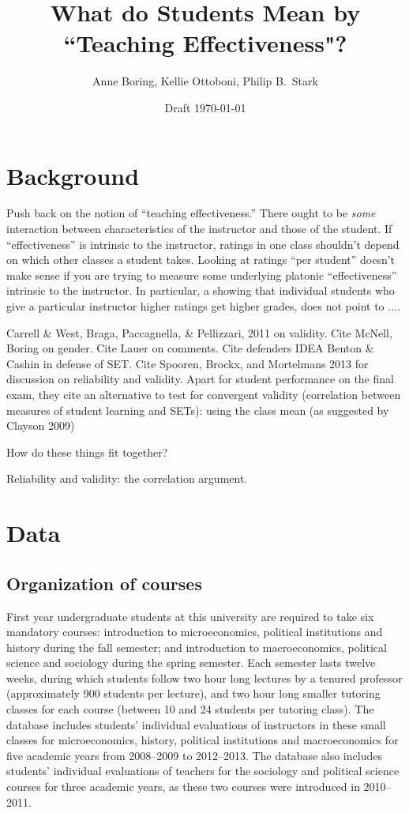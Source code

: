 \documentclass[12pt]{article}
\title{What do Students Mean by ``Teaching Effectiveness"?}
\author{Anne Boring, Kellie Ottoboni, Philip B.~Stark}
\date{Draft \today}
\newcommand{\todo}[1]{{\color{red}{TO DO: \sc #1}}}
\begin{document}
\maketitle

\section{Background}
Push back on the notion of ``teaching effectiveness.''
There ought to be \emph{some} interaction between characteristics of the
instructor and those of the student.
If ``effectiveness'' is intrinsic to the instructor, ratings in one class shouldn't depend on
which other classes a student takes.
Looking at ratings ``per student'' doesn't make sense if you are trying to
measure some underlying platonic ``effectiveness'' intrinsic to the instructor.
In particular,  a showing that individual students who give a particular instructor higher ratings
get higher grades, does not point to ....\todo{fix me}

Carrell \& West, Braga, Paccagnella, \& Pellizzari, 2011 on validity.
Cite McNell, Boring on gender.
Cite Lauer on comments.
Cite defenders IDEA Benton \& Cashin in defense of SET.  
Cite Spooren, Brockx, and Mortelmans 2013 for discussion on reliability and validity. Apart for student performance on 
the final exam, they cite an alternative to test for convergent validity (correlation between measures of student learning 
and SETs): using the class mean (as suggested by Clayson 2009) 

How do these things fit together?

Reliability and validity: the correlation argument.

\section{Data}
\subsection{Organization of courses}

First year undergraduate students at this university are required to take six mandatory courses: 
introduction to microeconomics, political institutions and history during the fall semester; 
and introduction to macroeconomics, political 
science and sociology during the spring semester. 
Each semester lasts twelve weeks, during which 
students follow two hour long lectures by a tenured professor
(approximately 900 students per lecture), and two hour long smaller tutoring classes for each course 
(between 10 and 24 students per tutoring class). 
The database includes students' individual evaluations of instructors 
in these small classes for microeconomics, history, political institutions and 
macroeconomics for five academic years from 
2008--2009 to 2012--2013. 
The database also includes students' individual evaluations of teachers for the sociology and
political science courses for three academic years, as these two courses were introduced in 2010--2011.
\end{document}
